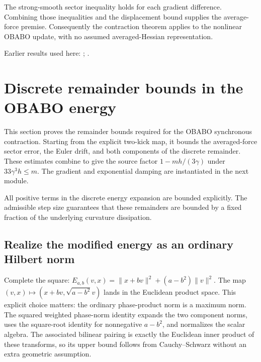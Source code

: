 \documentclass[11pt,a4paper]{report}
\begin{document}
The strong-smooth sector inequality holds for each gradient difference. Combining those inequalities and the displacement bound supplies the average-force premise. Consequently the contraction theorem applies to the nonlinear OBABO update, with no assumed averaged-Hessian representation.



Earlier results used here: \cite[Section~3.10.2]{LangevinLean2026ULASC}; \cite[Section~3.10.3]{LangevinLean2026ULASC}.
\section{\texorpdfstring{Discrete remainder bounds in the OBABO energy}{Discrete remainder bounds in the OBABO energy}}
\label{proof-module-KineticLangevin-OBABORemainder-lean}


This section proves the remainder bounds required for the OBABO synchronous contraction. Starting from the explicit two-kick map, it bounds the averaged-force sector error, the Euler drift, and both components of the discrete remainder. These estimates combine to give the source factor \(1-mh/(3\gamma)\) under \(33\gamma^3h\le m\). The gradient and exponential damping are instantiated in the next module.



All positive terms in the discrete energy expansion are bounded explicitly. The admissible step size guarantees that these remainders are bounded by a fixed fraction of the underlying curvature dissipation.

\subsection{\texorpdfstring{Realize the modified energy as an ordinary Hilbert norm}{Realize the modified energy as an ordinary Hilbert norm}}
\label{report-step-KineticLangevin-OBABORemainder-lean-1}


Complete the square: \(E_{a,b}(v,x)=\|x+bv\|^2+(a-b^2)\|v\|^2\). The map \((v,x)\mapsto(x+bv,\sqrt{a-b^2}v)\) lands in the Euclidean product space. This explicit choice matters: the ordinary phase-product norm is a maximum norm. The squared weighted phase-norm identity expands the two component norms, uses the square-root identity for nonnegative \(a-b^2\), and normalizes the scalar algebra. The associated bilinear pairing is exactly the Euclidean inner product of these transforms, so its upper bound follows from Cauchy–Schwarz without an extra geometric assumption.
\end{document}
